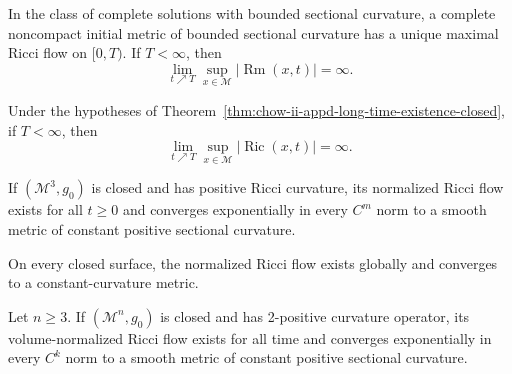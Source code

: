 \begin{theorem}
\label{thm:chow-ii-appd-long-time-existence-complete}


In the class of complete solutions with bounded sectional curvature, a
complete noncompact initial metric of bounded sectional curvature has a unique
maximal Ricci flow on $[0,T)$. If $T<\infty$, then
\[
 \lim_{t\nearrow T}\sup_{x\in\mathcal M}|\operatorname{Rm}(x,t)|=\infty.
\]
\end{theorem}

\begin{theorem}
\label{thm:chow-ii-appd-long-time-existence-ricci-blowup}


Under the hypotheses of Theorem~\ref{thm:chow-ii-appd-long-time-existence-closed},
if $T<\infty$, then
\[
 \lim_{t\nearrow T}\sup_{x\in\mathcal M}|\operatorname{Ric}(x,t)|=\infty.
\]
\end{theorem}

\begin{theorem}
\label{thm:chow-ii-appd-hamilton-positive-ricci-three-manifolds}

If $(\mathcal M^3,g_0)$ is closed and has positive Ricci curvature, its
normalized Ricci flow exists for all $t\geq0$ and converges exponentially in
every $C^m$ norm to a smooth metric of constant positive sectional curvature.
\end{theorem}

\begin{remark}
\label{rem:chow-ii-appd-closed-surfaces}

On every closed surface, the normalized Ricci flow exists globally and
converges to a constant-curvature metric.
\end{remark}

\begin{theorem}
\label{thm:chow-ii-appd-two-positive-curvature-convergence}


Let $n\geq3$. If $(\mathcal M^n,g_0)$ is closed and has 2-positive curvature
operator, its volume-normalized Ricci flow exists for all time and converges
exponentially in every $C^k$ norm to a smooth metric of constant positive
sectional curvature.
\end{theorem}

